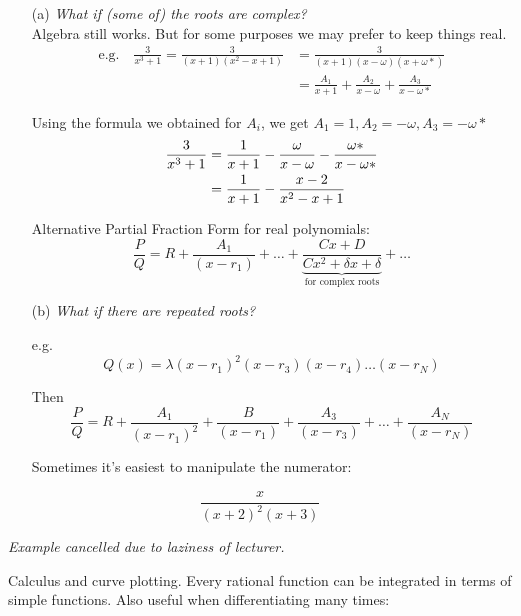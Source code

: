 \documentclass[10pt]{scrartcl}
\begin{document}
\begin{itemize}
\item[(a)] \textit{What if (some of) the roots are complex?}\\
Algebra still works. But for some purposes we may prefer to keep things real.
 \begin{align*} \nonumber \text{e.g.}\quad \frac{3}{x^3+1} = \frac{3}{(x+1)(x^2 - x + 1)} &= \frac{3}{(x+1)(x-\omega)(x+\omega *)} \\ &= \frac{A_1}{x+1} + \frac{A_2}{x - \omega} + \frac{A_3}{x - \omega *}
 \end{align*}\vspace*{5pt}

Using the formula we obtained for $A_i$, we get $A_1 = 1, A_2 = -\omega, A_3 = -\omega *$
\begin{align} \nonumber \frac{3}{x^3 + 1} &= \frac{1}{x+1} - \frac{\omega}{x-\omega} - \frac{\omega *}{x - \omega *} \\\vspace*{5pt} \nonumber
&= \frac{1}{x+1}  - \frac{x-2}{x^2 - x + 1} \end{align}

Alternative Partial Fraction Form for real polynomials:
\[\frac{P}{Q} = R + \frac{A_1}{(x-r_1)} + \dots + \underbrace{\frac{Cx + D}{Cx^2 + \delta x + \delta}}_\text{for complex roots} + \dots \]

\item[(b)] \textit{What if there are repeated roots?}

e.g. 
\[Q(x) = \lambda(x-r_1)^2(x-r_3)(x-r_4)\dots(x-r_N)\]

Then 
\[\frac{P}{Q} = R + \frac{A_1}{(x-r_1)^2} + \frac{B}{(x-r_1)} + \frac{A_3}{(x-r_3)} + \dots + \frac{A_N}{(x-r_N)}\]

Sometimes it's easiest to manipulate the numerator:\\
\end{itemize}

\begin{example}
\[	\frac{x}{(x+2)^2(x+3)}\]
	
\emph{Example cancelled due to laziness of lecturer.}
\end{example}\vspace*{5pt}


Calculus and curve plotting. Every rational function can be integrated in terms of simple functions. Also useful when differentiating many times:\\
\end{document}
